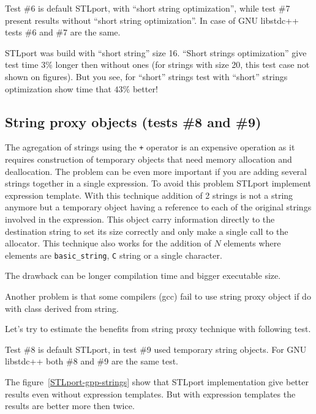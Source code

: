 \documentclass[a4paper]{article}
\providecommand{\STLport}{{\fontfamily{cmss}\selectfont STLport}}
\providecommand{\libstd}{{\fontfamily{cmtt}\selectfont GNU \mbox{libstdc++}}}
\begin{document}


Test \#6 is default \STLport{}, with ``short string optimization'', while
test \#7 present results without ``short string optimization''. In case of \libstd{}
tests \#6 and \#7 are the same.

\STLport{} was build with ``short string'' size 16. ``Short strings optimization'' give
test time $3\%$ longer then without ones (for strings with size 20, this test case
not shown on figures).
But you see, for ``short'' strings test with ``short'' strings optimization
show time that $43\%$ better!

\subsection{String proxy objects\label{add-string-proxy} (tests \#8 and \#9)}

The agregation of strings using the \verb|+| operator is an expensive operation
as it requires construction of temporary objects that need memory allocation
and deallocation. The problem can be even more important if you are adding
several strings together in a single expression. To avoid this problem \STLport{}
implement expression template. With this technique addition of 2 strings is not
a string anymore but a temporary object having a reference to each of the
original strings involved in the expression. This object carry information
directly to the destination string to set its size correctly and only make
a single call to the allocator. This technique also works for the addition of
$N$ elements where elements are \verb|basic_string|, \verb|C| string or a
single character.

The drawback can be longer compilation time and bigger executable size.

Another problem is that some compilers (gcc) fail to use string proxy object
if do with class derived from string.

Let's try to estimate the benefits from string proxy technique with following test.



Test \#8 is default \STLport{}, in test \#9 used temporary string objects.
For \libstd{} both \#8 and \#9 are the same test.


The figure~\ref{STLport-gpp-strings} show that \STLport{} implementation
give better results even without expression templates. But with
expression templates the results are better more then twice.
\end{document}
